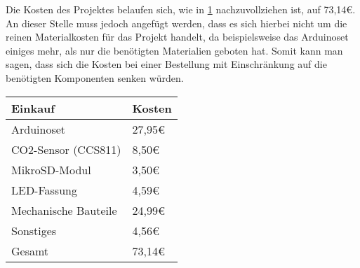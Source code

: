 \label{KostenundArbeitsplan}

Die Kosten des Projektes belaufen sich, wie in \ref{tab:Kosten} nachzuvollziehen ist, auf 73,14€. An dieser Stelle muss jedoch angefügt werden, dass es sich hierbei nicht um die reinen Materialkosten für das Projekt handelt, da beispielsweise das Arduinoset einiges mehr, als nur die benötigten Materialien geboten hat. Somit kann man sagen, dass sich die Kosten bei einer Bestellung mit Einschränkung auf die benötigten Komponenten senken würden. \\

\begin{table}[!hbt]
	
	\centering
	
	\begin{tabular}{|p{8cm}|p{8cm}|}
		
		\hline
		\rowcolor{lightgray} Einkauf & Kosten \\
		\hline
		Arduinoset & 27,95€ \\
		\hline
		CO2-Sensor (CCS811) & 8,50€ \\
		\hline
		MikroSD-Modul & 3,50€ \\
		\hline
		LED-Fassung & 4,59€ \\
		\hline
		Mechanische Bauteile & 24,99€ \\
		\hline
		Sonstiges & 4,56€ \\
		\hline
		\rowcolor{lightgray} Gesamt & 73,14€ \\
		\hline
		
	\end{tabular}
	
	\label{tab:Kosten}
	
\end{table}
